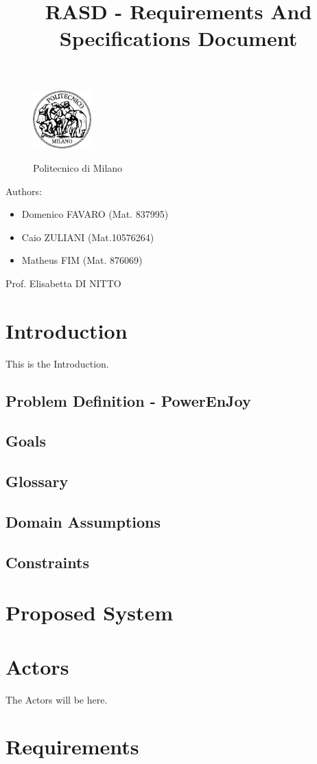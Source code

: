 \documentclass[a4paper]{article}
\title{RASD - Requirements And Specifications Document}
\begin{document}
\begin{titlepage}
\begin{figure}
\centering
\includegraphics[width=0.2\textwidth]{polimi.jpg}
\par
\LARGE Politecnico di Milano
\end{figure}


\maketitle
\raggedright
Authors:
\begin{itemize}
	\item Domenico FAVARO (Mat. 837995)
	\item Caio ZULIANI (Mat.10576264)
	\item Matheus FIM (Mat. 876069)
\end{itemize}
\raggedleft
Prof. Elisabetta DI NITTO
\end{titlepage}

\tableofcontents
\newpage
 
\section{Introduction}
 
This is the Introduction.
\subsection{Problem Definition - PowerEnJoy}
\subsection{Goals}
\subsection{Glossary}
\subsection{Domain Assumptions}
\subsection{Constraints}

\section{Proposed System}

\section{Actors}

The Actors will be here.

\section{Requirements}
\end{document}
